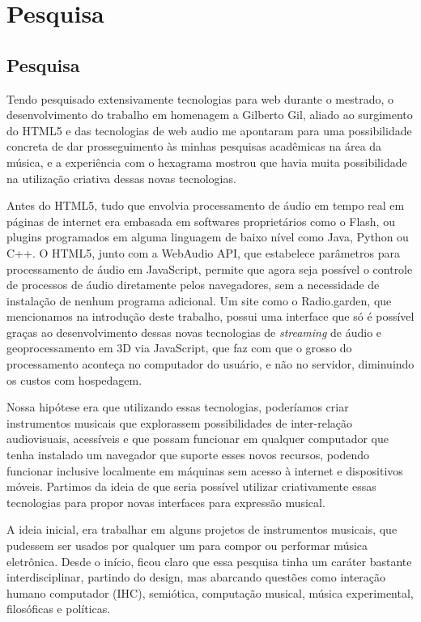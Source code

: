 \chapter{Pesquisa}
\label{ch:pesquisa}

\section{Pesquisa}

    Tendo pesquisado extensivamente tecnologias para web durante o mestrado, o desenvolvimento do trabalho em homenagem a Gilberto Gil, aliado ao surgimento do HTML5 e das tecnologias de web audio me apontaram para uma possibilidade concreta de dar prosseguimento às minhas pesquisas acadêmicas na área da música, e a experiência com o hexagrama mostrou que havia muita possibilidade na utilização criativa dessas novas tecnologias. 

Antes do HTML5, tudo que envolvia processamento de áudio em tempo real em páginas de internet era embasada em softwares proprietários como o Flash, ou plugins programados em alguma linguagem de baixo nível como Java, Python ou C++. O HTML5, junto com a WebAudio API, que estabelece parâmetros para processamento de áudio em JavaScript, permite que agora seja possível o controle de processos de áudio diretamente pelos navegadores, sem a necessidade de instalação de nenhum programa adicional. Um site como o Radio.garden, que mencionamos na introdução deste trabalho, possui uma interface que só é possível graças ao desenvolvimento dessas novas tecnologias de \emph{streaming} de áudio e geoprocessamento em 3D via JavaScript, que faz com que o grosso do processamento aconteça no computador do usuário, e não no servidor, diminuindo os custos com hospedagem.

Nossa hipótese era que utilizando essas tecnologias, poderíamos criar instrumentos musicais que explorassem possibilidades de inter-relação audiovisuais, acessíveis e que possam funcionar em qualquer computador que tenha instalado um navegador que suporte esses novos recursos, podendo funcionar inclusive localmente em máquinas sem acesso à internet e dispositivos móveis. Partimos da ideia de que seria possível utilizar criativamente essas tecnologias para propor novas interfaces para expressão musical.
    
A ideia inicial, era trabalhar em alguns projetos de instrumentos musicais, que pudessem ser usados por qualquer um para compor ou performar música eletrônica. Desde o início, ficou claro que essa pesquisa tinha um caráter bastante interdisciplinar, partindo do design, mas abarcando questões como interação humano computador (IHC), semiótica, computação musical, música experimental, filosóficas e políticas.




